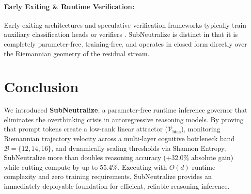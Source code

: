 \documentclass[10pt,twocolumn]{article}
\begin{document}
\paragraph{Early Exiting \& Runtime Verification:} Early exiting architectures \citep{schuster2022confident} and speculative verification frameworks \citep{safo2026rom, chen2024measuring} typically train auxiliary classification heads or verifiers \citep{lightman2023let}. SubNeutralize is distinct in that it is completely parameter-free, training-free, and operates in closed form directly over the Riemannian geometry of the residual stream.

\section{Conclusion}
\label{sec:conclusion}

We introduced \textbf{SubNeutralize}, a parameter-free runtime inference governor that eliminates the overthinking crisis in autoregressive reasoning models. By proving that prompt tokens create a low-rank linear attractor ($\mathcal{V}_{\text{bias}}$), monitoring Riemannian trajectory velocity across a multi-layer cognitive bottleneck band $\mathcal{B} = \{12, 14, 16\}$, and dynamically scaling thresholds via Shannon Entropy, SubNeutralize more than doubles reasoning accuracy (+32.0\% absolute gain) while cutting compute by up to 55.4\%. Executing with $O(d)$ runtime complexity and zero training requirements, SubNeutralize provides an immediately deployable foundation for efficient, reliable reasoning inference.
\end{document}
